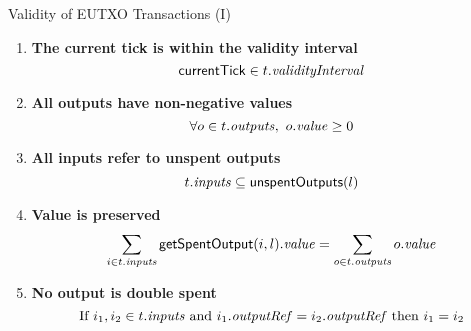 \newcommand{\seti}{\setcounter{saveenumi}{\value{enumi}}}
\newcommand{\conti}{\setcounter{enumi}{\value{saveenumi}}}

\begin{frame}{Validity of EUTXO Transactions (I)}

\begin{enumerate}
\item
  \label{rule:tick-in-range}
  \textbf{The current tick is within the validity interval}
  \begin{displaymath}
    \mathsf{currentTick} \in t.\mathit{validityInterval}
  \end{displaymath}

\item
  \label{rule:all-outputs-are-non-negative}
  \textbf{All outputs have non-negative values}
  \begin{displaymath}
    \forall o \in t.\mathit{outputs},\ o.\mathit{value} \geq 0
  \end{displaymath}

\item
  \label{rule:all-inputs-refer-to-unspent-outputs}
  \textbf{All inputs refer to unspent outputs}
  \begin{displaymath}
    t.\mathit{inputs} \subseteq \mathsf{unspentOutputs}(l)
  \end{displaymath}

\item
  \label{rule:value-is-preserved}
  \textbf{Value is preserved}
  \begin{displaymath}
    \sum_{i \in t.\mathit{inputs}} \mathsf{getSpentOutput}(i, l).\mathit{value} = \sum_{o \in t.\mathit{outputs}} o.\mathit{value}
  \end{displaymath}

\item
  \label{rule:no-double-spending}
  \textbf{No output is double spent}
  \begin{displaymath}
    \textrm{If } i_1, i_2 \in t.\mathit{inputs} \textrm{ and }  i_1.\mathit{outputRef} = i_2.\mathit{outputRef}
    \textrm{ then } i_1 = i_2
  \end{displaymath}

\seti

\end{enumerate}

\end{frame}

